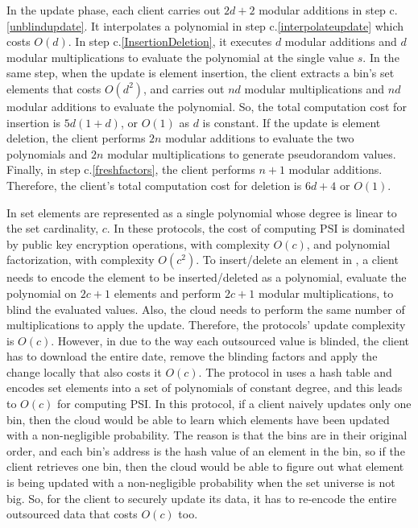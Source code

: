 In the update phase, each client  carries out $2d+2$ modular additions in step c.\ref{unblindupdate}. It interpolates a polynomial in step c.\ref{interpolateupdate} which costs $O(d)$.  In step c.\ref{InsertionDeletion}, it executes $d$ modular additions and $d$ modular multiplications to evaluate the polynomial at the single value $s$. In the same step, when the update is element insertion, the client extracts a bin's set elements that costs $O(d^{\scriptscriptstyle 2})$, and carries out $nd$ modular multiplications and $nd$ modular additions to evaluate the polynomial. So, the total computation cost for insertion is $5d(1+d)$, or $O(1)$ as $d$ is constant. If the update is element deletion, the client performs $2n$ modular additions to evaluate the two polynomials and $2n$ modular multiplications to generate  pseudorandom values. Finally, in step c.\ref{freshfactors}, the client performs $n+1$ modular additions. Therefore, the client's total computation cost for deletion is $6d+4$ or $O(1)$. 

In \cite{opsi15,DBLP:conf/fc/AbadiTD16,yang2018improved} set elements are represented as a single polynomial whose degree is linear to the set cardinality, $c$. In these protocols, the cost  of computing PSI is dominated by public key encryption operations, with complexity $O(c)$, and  polynomial factorization, with complexity $O(c^{\scriptscriptstyle 2})$. To insert/delete an element in  \cite{opsi15,yang2018improved}, a client needs to encode the element to be inserted/deleted as a polynomial, evaluate the polynomial on $2c+1$ elements and perform $2c+1$ modular multiplications, to blind the evaluated values. Also, the cloud needs to perform the same number of multiplications to apply the update. Therefore, the protocols' update complexity is $O(c)$. However, in \cite{DBLP:conf/fc/AbadiTD16} due to the way each outsourced value is blinded, the client has to download the entire date, remove the blinding factors and apply the change locally that also costs it $O(c)$. The protocol in \cite{eopsi} uses a hash table and encodes  set elements into a set of polynomials of constant degree, and this leads to $O(c)$ for computing PSI. In this protocol, if a client naively updates only one bin, then the cloud would be able to learn which elements have been updated with a non-negligible probability. The reason is that the bins are in their original order, and each bin's address is the hash value of an element in the bin, so if the client retrieves one bin, then the cloud would be able to figure out  what element is being updated  with a non-negligible probability when the set universe is not big. So, for the client to securely update its data, it has to re-encode the entire outsourced data that costs $O(c)$ too. 


